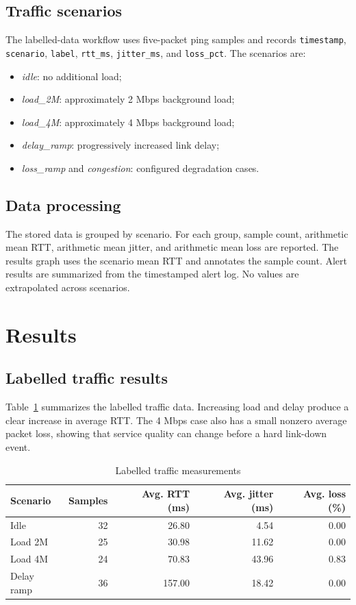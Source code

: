 \documentclass[conference]{IEEEtran}
\begin{document}
\subsection{Traffic scenarios}

The labelled-data workflow uses five-packet ping samples and records
\texttt{timestamp}, \texttt{scenario}, \texttt{label}, \texttt{rtt\_ms},
\texttt{jitter\_ms}, and \texttt{loss\_pct}. The scenarios are:
\begin{itemize}
\item \textit{idle}: no additional load;
\item \textit{load\_2M}: approximately 2 Mbps background load;
\item \textit{load\_4M}: approximately 4 Mbps background load;
\item \textit{delay\_ramp}: progressively increased link delay;
\item \textit{loss\_ramp} and \textit{congestion}: configured degradation cases.
\end{itemize}

\subsection{Data processing}

The stored data is grouped by scenario. For each group, sample count,
arithmetic mean RTT, arithmetic mean jitter, and arithmetic mean loss are
reported. The results graph uses the scenario mean RTT and annotates the sample
count. Alert results are summarized from the timestamped alert log. No values
are extrapolated across scenarios.

\section{Results}
\label{sec:results}

\subsection{Labelled traffic results}

Table~\ref{tab:labelled} summarizes the labelled traffic data. Increasing load
and delay produce a clear increase in average RTT. The 4 Mbps case also has a
small nonzero average packet loss, showing that service quality can change
before a hard link-down event.

\begin{table}[t]
\centering
\caption{Labelled traffic measurements}
\label{tab:labelled}
\begin{tabular}{lrrrr}
\toprule
Scenario & Samples & Avg. RTT (ms) & Avg. jitter (ms) & Avg. loss (\%)\\
\midrule
Idle & 32 & 26.80 & 4.54 & 0.00\\
Load 2M & 25 & 30.98 & 11.62 & 0.00\\
Load 4M & 24 & 70.83 & 43.96 & 0.83\\
Delay ramp & 36 & 157.00 & 18.42 & 0.00\\
\bottomrule
\end{tabular}
\end{table}
\end{document}
